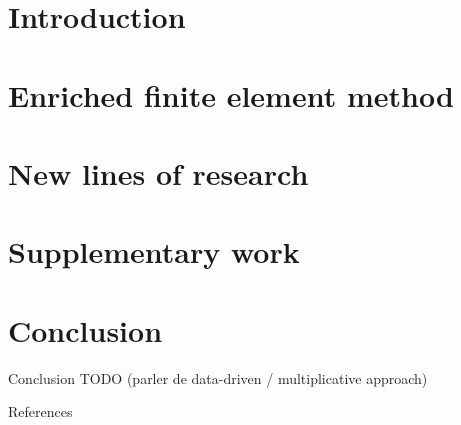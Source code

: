 \documentclass[compress,10pt,xcolor={table,dvipsnames},t]{beamer} %
\newcommand{\insertsectionheadSubtitle}{}
\begin{document}

	\section*{Introduction}
	
	
	
	\renewcommand{\insertsectionheadSubtitle}{This section is based on \citep{ours_2025}.}
	\section{Enriched finite element method}
	
	\renewcommand{\insertsectionheadSubtitle}{}

	\section{New lines of research}
	

	\section{Supplementary work}
	

	\section*{Conclusion}

	\begin{frame}{Conclusion}
		TODO
		(parler de data-driven / multiplicative approach)
	\end{frame}
	
	{ 	
	\begin{frame}{References}
		\Large
		
	\end{frame}
	}
	\addtocounter{framenumber}{-1} 
	
	
	\appendix
	
	
	
\end{document}
